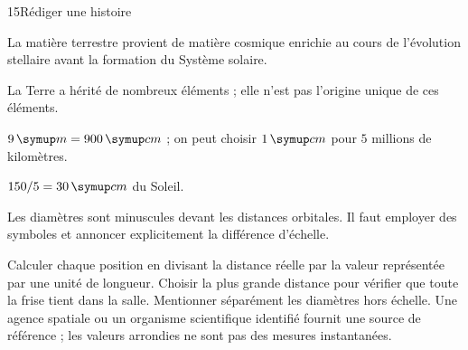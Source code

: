 \par\noindent\begin{minipage}{\linewidth}
\begin{corrige}{15}{Rédiger une histoire}
\begin{questions}
\item La matière terrestre provient de matière cosmique enrichie au cours de l’évolution stellaire avant la formation du Système solaire.
\item La Terre a hérité de nombreux éléments ; elle n’est pas l’origine unique de ces éléments.
\end{questions}
\end{corrige}
\end{minipage}
\par\noindent\begin{minipage}{\linewidth}
\label{cor-defi-7}\begin{questions}
\item $9\unite m=900\unite{cm}$ ; on peut choisir $1\unite{cm}$ pour $5$ millions de kilomètres.
\item $150/5=30\unite{cm}$ du Soleil.
\item Les diamètres sont minuscules devant les distances orbitales. Il faut employer des symboles et annoncer explicitement la différence d’échelle.
\end{questions}
\end{minipage}
\par\noindent\begin{minipage}{\linewidth}
\label{cor-activite-7}
Calculer chaque position en divisant la distance réelle par la valeur représentée par une unité de longueur. Choisir la plus grande distance pour vérifier que toute la frise tient dans la salle. Mentionner séparément les diamètres hors échelle. Une agence spatiale ou un organisme scientifique identifié fournit une source de référence ; les valeurs arrondies ne sont pas des mesures instantanées.\par\end{minipage}
